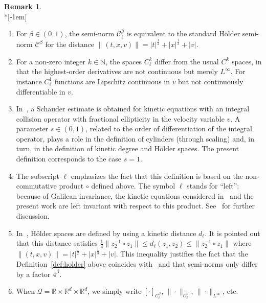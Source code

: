 \documentclass[10pt]{amsart}
\theoremstyle{definition}\newtheorem{defi}[theo]{Definition}\newtheorem{rema}[theo]{Remark}\newtheorem{exam}[theo]{Example}\newtheorem{exem}[theo]{Example}\newtheorem{nota}[theo]{Notation}
\newcommand{\N}{\mathbb{N}}
\newcommand{\R}{\mathbb{R}}
\newcommand{\cC}{\mathcal{C}}
\newcommand{\cQ}{\mathcal{Q}}
\begin{document}
\begin{rema}\ \\*[-1em]
\begin{enumerate}
\item \label{rema2.3.1} For $\beta \in (0,1)$, the semi-norm $\cC^\beta_\ell$ is equivalent to the standard H\"older semi-norm $\cC^\beta$ for the distance $\|(t,x,v)\|=|t|^{\frac12} + |x|^{\frac13} + |v|$.

\item \label{rema2.3.2}For a non-zero integer $k \in \N$, the spaces $C^k_\ell$ differ from the usual $C^k$ spaces, in that the highest-order derivatives are not continuous but merely $L^\infty$. For instance $C^1_\ell$ functions are Lipschitz continuous in $v$ but not continuously differentiable in $v$.


\item \label{rema2.3.3}In~\cite{imbert2018schauder}, a Schauder estimate is obtained for kinetic equations with an integral collision operator with fractional ellipticity in the velocity variable $v$. A parameter $s \in (0,1)$, related to the order of differentiation of the integral operator, plays a role in the definition of cylinders (through scaling) and, in turn, in the definition of kinetic degree and H\"older spaces. The present definition corresponds to the case $s=1$.

\item \label{rema2.3.4}The subscript $\ell$ emphasizes the fact that this definition is based on the non-commutative product $\circ$ defined above. The symbol $\ell$ stands for ``left'': because of Galilean invariance, the kinetic equations considered in~\cite{imbert2018schauder} and the present work are left invariant with respect to this product. See~\cite{imbert2018schauder} for further discussion.

\item \label{rema2.3.5}In~\cite{imbert2018schauder}, H\"older spaces are defined by using a kinetic distance $d_\ell$. It is pointed out that this distance satisfies $\frac14 \|z_2^{-1} \circ z_1\| \le d_\ell (z_1,z_2) \le
\|z_2^{-1} \circ z_1\|$ where $\|(t,x,v)\|=|t|^{\frac12} + |x|^{\frac13} + |v|$. This inequality justifies the fact that the Definition~\ref{def:holder} above coincides with~\cite[Definition~2.3]{imbert2018schauder} and that semi-norms only differ by a factor $4^\beta$.

\item \label{rema2.3.6}When $\cQ = \R \times \R^d \times \R^d$, we simply write $[\cdot]_{\cC_\ell^{\beta}}$, $\|\cdot\|_{\cC_\ell^{\beta}}$, $\|\cdot\|_{L^\infty}$, etc.
\end{enumerate}
\end{rema}
\end{document}
